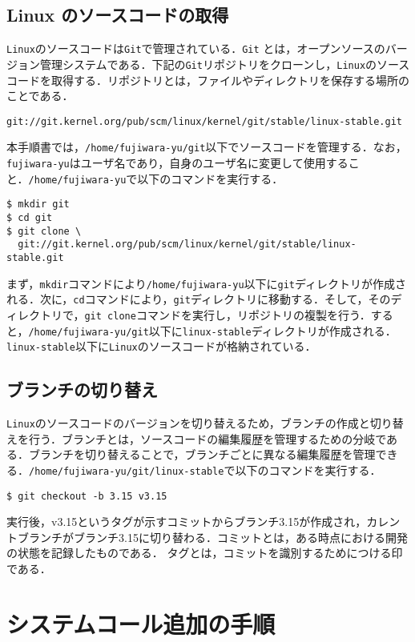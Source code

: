 \documentclass[12pt]{jsarticle}
\begin{document}
\subsection{Linux のソースコードの取得}
\verb|Linux|のソースコードは\verb|Git|で管理されている．\verb|Git| とは，オープンソースのバージョン管理システムである．下記の\verb|Git|リポジトリをクローンし，\verb|Linux|のソースコードを取得する．リポジトリとは，ファイルやディレクトリを保存する場所のことである．
\begin{verbatim}
git://git.kernel.org/pub/scm/linux/kernel/git/stable/linux-stable.git
\end{verbatim}
本手順書では，\verb|/home/fujiwara-yu/git|以下でソースコードを管理する．なお，\verb|fujiwara-yu|はユーザ名であり，自身のユーザ名に変更して使用すること．\verb|/home/fujiwara-yu|で以下のコマンドを実行する．
\begin{verbatim}
$ mkdir git
$ cd git
$ git clone \
  git://git.kernel.org/pub/scm/linux/kernel/git/stable/linux-stable.git
\end{verbatim}
まず，\verb|mkdir|コマンドにより\verb|/home/fujiwara-yu|以下に\verb|git|ディレクトリが作成される．次に，\verb|cd|コマンドにより，\verb|git|ディレクトリに移動する．そして，そのディレクトリで，\verb|git clone|コマンドを実行し，リポジトリの複製を行う．すると，\verb|/home/fujiwara-yu/git|以下に\verb|linux-stable|ディレクトリが作成される．\verb|linux-stable|以下に\verb|Linux|のソースコードが格納されている．

\subsection{ブランチの切り替え}
\verb|Linux|のソースコードのバージョンを切り替えるため，ブランチの作成と切り替えを行う．ブランチとは，ソースコードの編集履歴を管理するための分岐である．ブランチを切り替えることで，ブランチごとに異なる編集履歴を管理できる．\verb|/home/fujiwara-yu/git/linux-stable|で以下のコマンドを実行する．
\begin{verbatim}
$ git checkout -b 3.15 v3.15
\end{verbatim}
実行後，v3.15というタグが示すコミットからブランチ3.15が作成され，カレントブランチがブランチ3.15に切り替わる．コミットとは，ある時点における開発の状態を記録したものである．
タグとは，コミットを識別するためにつける印である．

\section{システムコール追加の手順}\label{sec:procedure}
\end{document}
